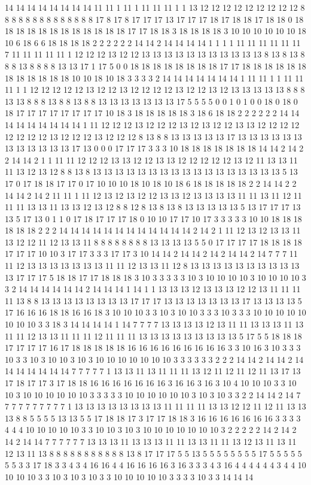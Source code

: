 14 14 14 14 14 14 14 14 11 11 1 11 1 11 11 11 1 1 13 12 12 12 12 12 12 12 12 12 8 8 8 8 8 8 8 8 8 8 8 8 8 8 17 8 17 8 17 17 17 13 17 17 17 18 17 18 18 17 18 18 0 18 18 18 18 18 18 18 18 18 18 18 18 17 17 18 18 3 18 18 18 18 3 10 10 10 10 10 10 18 10 6 18 6 6 18 18 18 18 2 2 2 2 2 2 14 14 2 14 14 14 14 1 1 1 1 11 11 11 11 11 11 7 11 11 11 11 11 1 12 12 12 13 12 12 13 13 13 13 13 13 13 13 13 13 13 8 13 8 13 8 8 8 13 8 8 8 8 13 13 17 1 17 5 0 0 18 18 18 18 18 18 18 18 17 17 18 18 18 18 18 18 18 18 18 18 18 18 10 10 18 10 18 3 3 3 3 2 14 14 14 14 14 14 14 1 11 11 1 1 11 11 11 1 1 12 12 12 12 12 13 12 12 13 12 12 12 12 13 12 12 13 12 13 13 13 13 13 8 8 8 13 13 8 8 8 13 8 8 13 8 8 13 13 13 13 13 13 13 17 5 5 5 5 0 0 1 0 1 0 0 18 0 18 0 18 17 17 17 17 17 17 17 17 10 18 3 18 18 18 18 18 3 18 6 18 18 2 2 2 2 2 2 14 14 14 14 14 14 14 14 14 1 11 12 12 12 13 12 12 12 13 12 13 12 12 13 13 12 12 12 12 12 12 12 12 13 12 12 12 13 12 12 12 8 13 8 8 13 13 13 13 13 17 13 13 13 13 13 13 13 13 13 13 13 13 17 13 0 0 0 17 17 17 3 3 3 10 18 18 18 18 18 18 18 14 14 2 14 2 2 14 14 2 1 1 11 11 12 12 12 13 13 12 12 13 13 12 12 12 12 12 13 12 11 13 13 11 11 13 12 13 12 8 8 13 8 13 13 13 13 13 13 13 13 13 13 13 13 13 13 13 13 13 5 13 17 0 17 18 18 17 17 0 17 10 10 10 18 10 18 10 18 6 18 18 18 18 18 2 2 14 14 2 2 14 14 2 14 2 11 11 1 11 12 13 12 13 12 12 13 13 12 13 13 13 13 11 11 13 11 12 11 11 11 13 13 11 13 13 12 13 12 8 8 12 8 13 8 13 8 13 13 13 13 13 5 13 17 17 17 13 13 5 17 13 0 1 1 0 17 18 17 17 17 18 0 10 10 17 17 10 17 3 3 3 3 3 10 10 18 18 18 18 18 18 2 2 2 14 14 14 14 14 14 14 14 14 14 14 14 2 14 2 1 11 12 13 12 13 13 11 13 12 12 11 12 13 13 11 8 8 8 8 8 8 8 8 13 13 13 13 5 5 0 17 17 17 17 18 18 18 18 17 17 17 10 10 3 17 17 3 3 3 17 17 3 10 14 14 2 14 14 2 14 2 14 14 2 14 7 7 7 11 11 12 13 13 13 13 13 13 13 11 11 12 13 13 11 12 8 13 13 13 13 13 13 13 13 13 13 13 17 17 17 5 18 18 17 17 18 18 18 3 10 3 3 3 3 3 10 3 10 10 10 10 3 10 10 10 10 3 3 2 14 14 14 14 14 14 2 14 14 14 1 14 1 1 13 13 13 12 13 13 13 12 12 13 11 11 11 11 13 8 8 13 13 13 13 13 13 13 13 17 17 17 13 13 13 13 13 13 13 17 13 13 13 13 5 17 16 16 16 18 18 16 16 18 3 10 10 10 3 3 10 3 10 10 3 3 3 10 3 3 3 10 10 10 10 10 10 10 10 3 3 18 3 14 14 14 14 1 14 7 7 7 7 13 13 13 13 12 13 11 11 13 13 13 11 13 11 11 12 13 13 11 11 11 12 11 11 11 13 13 13 13 13 13 13 13 13 5 17 5 5 18 18 18 17 17 17 17 16 17 18 18 18 18 18 16 16 16 16 16 16 16 16 16 3 3 10 16 3 10 3 3 3 10 3 3 10 3 10 10 3 10 3 10 10 10 10 10 10 10 3 3 3 3 3 3 2 2 2 14 14 2 14 14 2 14 14 14 14 14 14 14 7 7 7 7 7 1 13 13 11 13 11 11 11 13 12 11 12 11 12 11 13 17 13 17 18 17 17 3 17 18 18 16 16 16 16 16 16 16 3 16 16 3 16 3 10 4 10 10 10 3 3 10 10 3 10 10 10 10 10 10 3 3 3 3 3 10 10 10 10 10 10 3 10 3 10 3 3 2 2 14 14 2 14 7 7 7 7 7 7 7 7 7 7 1 13 13 13 13 13 13 13 13 11 11 11 11 13 13 12 12 11 12 11 13 13 13 8 8 5 5 5 5 13 13 5 5 17 18 18 17 3 17 17 18 18 3 16 16 16 16 16 16 16 3 3 3 3 4 4 4 10 10 10 10 10 3 3 10 10 3 10 3 10 10 10 10 10 10 10 3 2 2 2 2 2 14 2 14 2 14 2 14 14 7 7 7 7 7 7 13 13 13 11 13 13 13 11 11 13 13 11 11 13 12 13 11 13 11 12 13 11 13 8 8 8 8 8 8 8 8 8 8 8 13 8 17 17 17 5 5 13 5 5 5 5 5 5 5 5 17 5 5 5 5 5 5 5 3 3 17 18 3 3 4 3 4 16 16 4 4 16 16 16 16 3 16 3 3 3 4 3 16 4 4 4 4 4 4 3 4 4 10 10 10 10 3 3 10 3 10 3 10 3 3 10 10 10 10 10 3 3 3 3 10 3 3 14 14 14 